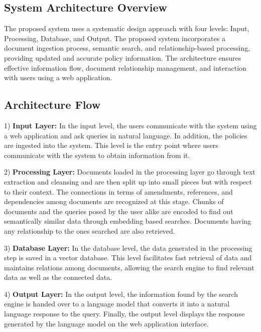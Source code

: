 \documentclass[conference]{IEEEtran}
\begin{document}

\subsection{System Architecture Overview}
The proposed system uses a systematic design approach with four levels: Input, Processing, Database, and Output. The proposed system incorporates a document ingestion process, semantic search, and relationship-based processing, providing updated and accurate policy information. The architecture ensures effective information flow, document relationship management, and interaction with users using a web application.

\subsection{Architecture Flow}
1) \textbf{Input Layer:} In the input level, the users communicate with the system using a web application and ask queries in natural language. In addition, the policies are ingested into the system. This level is the entry point where users communicate with the system to obtain information from it.

2) \textbf{Processing Layer:} Documents loaded in the processing layer go through text extraction and cleansing and are then split up into small pieces but with respect to their context. The connections in terms of amendments, references, and dependencies among documents are recognized at this stage. Chunks of documents and the queries posed by the user alike are encoded to find out semantically similar data through embedding based searches. Documents having any relationship to the ones searched are also retrieved.

3) \textbf{Database Layer:} In the database level, the data generated in the processing step is saved in a vector database. This level facilitates fast retrieval of data and maintains relations among documents, allowing the search engine to find relevant data as well as the connected data.

4) \textbf{Output Layer:} In the output level, the information found by the search engine is handed over to a language model that converts it into a natural language response to the query. Finally, the output level displays the response generated by the language model on the web application interface.
\end{document}
